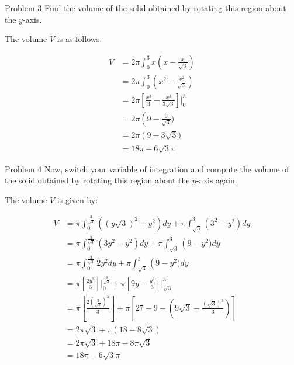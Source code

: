 \documentclass{article}
\begin{document}
    \begin{tbhtheorem}{Problem 3}
        Find the volume of the solid obtained by rotating this region about the $y$-axis.
    \end{tbhtheorem}

    The volume $V$ is as follows.

    \begin{align*}
        V   &= 2\pi\int_0^3 x\left(x-\frac{x}{\sqrt{3}}\right) \\
            &= 2\pi\int_0^3 \left(x^2 - \frac{x^2}{\sqrt{3}}\right) \\
            &= 2\pi\left[\frac{x^3}{3}-\frac{x^3}{3\sqrt{3}}\right]\Big|_0^3 \\
            &= 2\pi\left(9 - \frac{9}{\sqrt{3}}) \\
            &= 2\pi\left(9 - 3\sqrt{3}) \\
            &= 18\pi - 6\sqrt{3}\pi
    \end{align*}


    \begin{tbhtheorem}{Problem 4}
        Now, switch your variable of integration and compute the volume of the solid obtained by rotating this region about the $y$-axis again.
    \end{tbhtheorem}

    The volume $V$ is given by:

    \begin{align*}
        V   &= \pi\int_0^{\frac{3}{\sqrt{3}}} \left((y\sqrt{3})^2+y^2\right)dy + \pi\int_{\sqrt{3}}^3 \left(3^2-y^2\right)dy \\
            &= \pi\int_0^{\frac{3}{\sqrt{3}}} (3y^2 - y^2)dy + \pi\int_{\sqrt{3}}^3 \left(9-y^2)dy \\
            &= \pi\int_0^{\frac{3}{\sqrt{3}}}2y^2 dy + \pi\int_{\sqrt{3}}^3 \left(9-y^2)dy \\
            &= \pi\left[\frac{2y^3}{3}\right]\Big|_0^{\frac{3}{\sqrt{3}}} + \pi\left[9y-\frac{y^3}{3}\right]\Big|_{\sqrt{3}}^3 \\
            &= \pi\left[\frac{2\left(\frac{3}{\sqrt{3}}\right)^3}{3}\right] + \pi\left[27-9-\left(9\sqrt{3}-\frac{(\sqrt{3})^3}{3}\right)\right] \\
            &= 2\pi\sqrt{3} + \pi (18-8\sqrt{3}) \\
            &= 2\pi\sqrt{3} + 18\pi - 8\pi\sqrt{3} \\
            &= 18\pi - 6\sqrt{3}\pi
    \end{align*}
\end{document}
